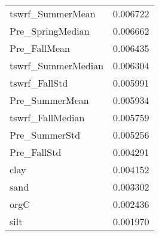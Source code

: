 \begin{tabular}{lr}
tswrf_SummerMean & 0.006722 \\
Pre_SpringMedian & 0.006662 \\
Pre_FallMean & 0.006435 \\
tswrf_SummerMedian & 0.006304 \\
tswrf_FallStd & 0.005991 \\
Pre_SummerMean & 0.005934 \\
tswrf_FallMedian & 0.005759 \\
Pre_SummerStd & 0.005256 \\
Pre_FallStd & 0.004291 \\
clay & 0.004152 \\
sand & 0.003302 \\
orgC & 0.002436 \\
silt & 0.001970 \\
\bottomrule
\end{tabular}
